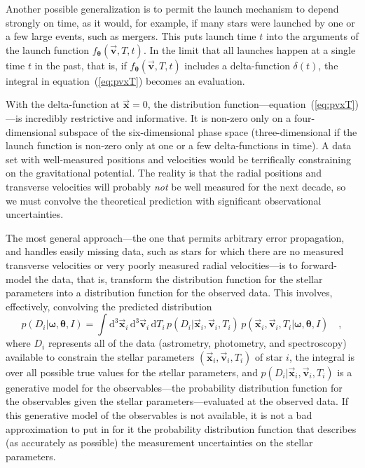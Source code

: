 \documentclass[12pt]{article}
\newcommand{\equationname}{equation}
\newcommand{\tvector}[1]{\boldsymbol{\vec{#1}}}
\newcommand{\vx}{\tvector{x}}
\newcommand{\vv}{\tvector{v}}
\newcommand{\pvector}[1]{\boldsymbol{#1}}
\newcommand{\vtheta}{\pvector{\theta}}
\newcommand{\vomega}{\pvector{\omega}}
\newcommand{\dd}{\mathrm{d}}
\newcommand{\flaunch}{f_{\vtheta}}
\begin{document}
Another possible generalization is to permit the launch mechanism to
depend strongly on time, as it would, for example, if many stars were
launched by one or a few large events, such as mergers.  This puts
launch time $t$ into the arguments of the launch function
$\flaunch(\vv,T,t)$.  In the limit that all launches happen at a
single time $t$ in the past, that is, if $\flaunch(\vv,T,t)$ includes
a delta-function $\delta(t)$, the integral in
\equationname~(\ref{eq:pvxT}) becomes an evaluation.

With the delta-function at $\vx=0$, the distribution
function---\equationname~(\ref{eq:pvxT})---is incredibly restrictive
and informative.  It is non-zero only on a four-dimensional subspace
of the six-dimensional phase space (three-dimensional if the launch
function is non-zero only at one or a few delta-functions in time).  A
data set with well-measured positions and velocities would be
terrifically constraining on the gravitational potential.  The reality
is that the radial positions and transverse velocities will probably
\emph{not} be well measured for the next decade, so we must convolve
the theoretical prediction with significant observational
uncertainties.

The most general approach---the one that permits arbitrary error
propagation, and handles easily missing data, such as stars for which
there are no measured transverse velocities or very poorly measured
radial velocities---is to forward-model the data, that is, transform
the distribution function for the stellar parameters into a
distribution function for the observed data.  This involves,
effectively, convolving the predicted distribution
\begin{equation}\label{eq:pdata}
p(D_i|\vomega,\vtheta,I) = \int\dd^3\vx_i\,\dd^3\vv_i\,\dd T_i
 \,p(D_i|\vx_i,\vv_i,T_i)\,p(\vx_i,\vv_i,T_i|\vomega,\vtheta,I) \quad ,
\end{equation}
where $D_i$ represents all of the data (astrometry, photometry, and
spectroscopy) available to constrain the stellar parameters
$(\vx_i,\vv_i,T_i)$ of star $i$, the integral is over all possible
true values for the stellar parameters, and $p(D_i|\vx_i,\vv_i,T_i)$
is a generative model for the observables---the probability
distribution function for the observables given the stellar
parameters---evaluated at the observed data.  If this generative model
of the observables is not available, it is not a bad approximation to
put in for it the probability distribution function that describes (as
accurately as possible) the measurement uncertainties on the stellar
parameters.
\end{document}
